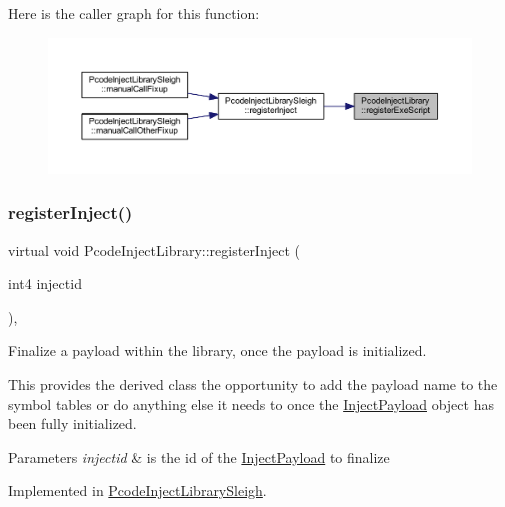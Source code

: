 Here is the caller graph for this function\+:
\nopagebreak
\begin{figure}[H]
\begin{center}
\leavevmode
\includegraphics[width=350pt]{class_pcode_inject_library_a73430017e8dc38985a1e20196e59eb85_icgraph}
\end{center}
\end{figure}
\mbox{\label{class_pcode_inject_library_a0b75b562fb736f23269114fec5ca36d9}} 
\subsubsection{\texorpdfstring{registerInject()}{registerInject()}}
{\footnotesize\ttfamily virtual void Pcode\+Inject\+Library\+::register\+Inject (\begin{DoxyParamCaption}\item[{int4}]{injectid }\end{DoxyParamCaption})\hspace{0.3cm}{\ttfamily [protected]}, {}}



Finalize a payload within the library, once the payload is initialized. 

This provides the derived class the opportunity to add the payload name to the symbol tables or do anything else it needs to once the \mbox{\hyperlink{class_inject_payload}{Inject\+Payload}} object has been fully initialized. 
\begin{DoxyParams}{Parameters}
{\em injectid} & is the id of the \mbox{\hyperlink{class_inject_payload}{Inject\+Payload}} to finalize \\
\hline
\end{DoxyParams}


Implemented in \mbox{\hyperlink{class_pcode_inject_library_sleigh_a8aa3b83b22fef0799e95dfaf346ca89e}{Pcode\+Inject\+Library\+Sleigh}}.

